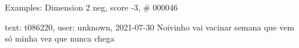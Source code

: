 \begin{frame}{Examples: Dimension 2 neg, score -3, \# 000046}
\footnotesize
\begin{alertblock}{text: t086220, user: unknown, 2021-07-30}
Noivinho vai vacinar semana que vem \textbf{} 
 só minha vez que nunca chega 
\textbf{}  
\end{alertblock}
\end{frame}
